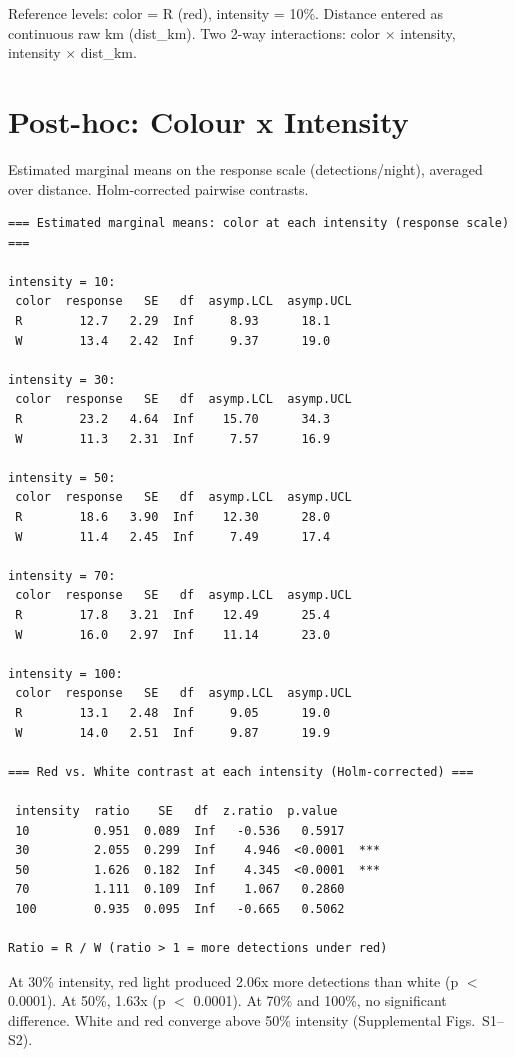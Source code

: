 \documentclass[11pt, letterpaper]{article}
\begin{document}
Reference levels: color = R (red), intensity = 10\%.
Distance entered as continuous raw km (dist\_km).
Two 2-way interactions: color $\times$ intensity, intensity $\times$ dist\_km.

\section{Post-hoc: Colour x Intensity}

Estimated marginal means on the response scale (detections/night),
averaged over distance. Holm-corrected pairwise contrasts.

\begin{verbatim}
=== Estimated marginal means: color at each intensity (response scale) ===

intensity = 10:
 color  response   SE   df  asymp.LCL  asymp.UCL
 R        12.7   2.29  Inf     8.93      18.1
 W        13.4   2.42  Inf     9.37      19.0

intensity = 30:
 color  response   SE   df  asymp.LCL  asymp.UCL
 R        23.2   4.64  Inf    15.70      34.3
 W        11.3   2.31  Inf     7.57      16.9

intensity = 50:
 color  response   SE   df  asymp.LCL  asymp.UCL
 R        18.6   3.90  Inf    12.30      28.0
 W        11.4   2.45  Inf     7.49      17.4

intensity = 70:
 color  response   SE   df  asymp.LCL  asymp.UCL
 R        17.8   3.21  Inf    12.49      25.4
 W        16.0   2.97  Inf    11.14      23.0

intensity = 100:
 color  response   SE   df  asymp.LCL  asymp.UCL
 R        13.1   2.48  Inf     9.05      19.0
 W        14.0   2.51  Inf     9.87      19.9

=== Red vs. White contrast at each intensity (Holm-corrected) ===

 intensity  ratio    SE   df  z.ratio  p.value
 10         0.951  0.089  Inf   -0.536   0.5917
 30         2.055  0.299  Inf    4.946  <0.0001  ***
 50         1.626  0.182  Inf    4.345  <0.0001  ***
 70         1.111  0.109  Inf    1.067   0.2860
 100        0.935  0.095  Inf   -0.665   0.5062

Ratio = R / W (ratio > 1 = more detections under red)
\end{verbatim}

At 30\% intensity, red light produced 2.06x more detections than white
(p $<$ 0.0001). At 50\%, 1.63x (p $<$ 0.0001). At 70\% and 100\%, no
significant difference. White and red converge above 50\% intensity
(Supplemental Figs.\ S1--S2).
\end{document}
